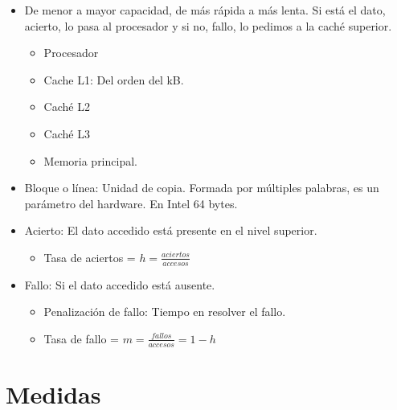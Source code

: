 \documentclass[12pt, twoside, openright]{report} %
\begin{document}
\begin{itemize}

	\item De menor a mayor capacidad, de más rápida a más lenta. Si está el
	      dato, acierto, lo pasa al procesador y si no, fallo, lo pedimos a
	      la caché superior.

	      \begin{itemize}

		      \item Procesador
		      \item Cache L1: Del orden del kB.
		      \item Caché L2
		      \item Caché L3
		      \item Memoria principal.
	      \end{itemize}
	\item Bloque o línea: Unidad de copia. Formada por múltiples palabras,
	      es un parámetro del hardware. En Intel 64 bytes.
	\item Acierto: El dato accedido está presente en el nivel superior.

	      \begin{itemize}

		      \item Tasa de aciertos = \(h= \frac {aciertos} {accesos}\)
	      \end{itemize}
	\item Fallo: Si el dato accedido está ausente.

	      \begin{itemize}

		      \item Penalización de fallo: Tiempo en resolver el fallo.
		      \item Tasa de fallo = \(m= \frac {fallos} {accesos}=1-h\)
	      \end{itemize}
\end{itemize}
\section{Medidas}
\end{document}

